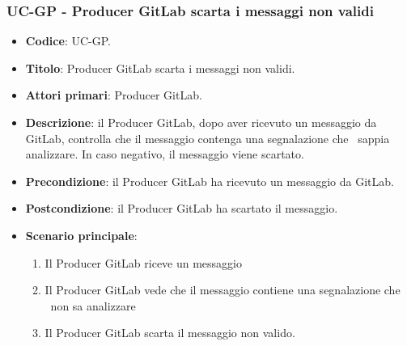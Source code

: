 \subsubsection{UC\theuccount-GP - Producer GitLab scarta i messaggi non validi}

	\begin{itemize}
		\item \textbf{Codice}: UC\theuccount-GP.
		\item \textbf{Titolo}: Producer GitLab scarta i messaggi non validi.
		\item \textbf{Attori primari}: Producer GitLab.
		\item \textbf{Descrizione}: il Producer GitLab, dopo aver ricevuto un messaggio da GitLab, controlla
        che il messaggio contenga una segnalazione che \progetto\ sappia analizzare. In caso negativo, il messaggio viene scartato.
        \item \textbf{Precondizione}: il Producer GitLab ha ricevuto un messaggio da GitLab.
        \item \textbf{Postcondizione}: il Producer GitLab ha scartato il messaggio.
        \item \textbf{Scenario principale}:
        \begin{enumerate}
            \item Il Producer GitLab riceve un messaggio
            \item Il Producer GitLab vede che il messaggio contiene una segnalazione che \progetto\ non sa analizzare
            \item Il Producer GitLab scarta il messaggio non valido.
        \end{enumerate}
    \end{itemize}